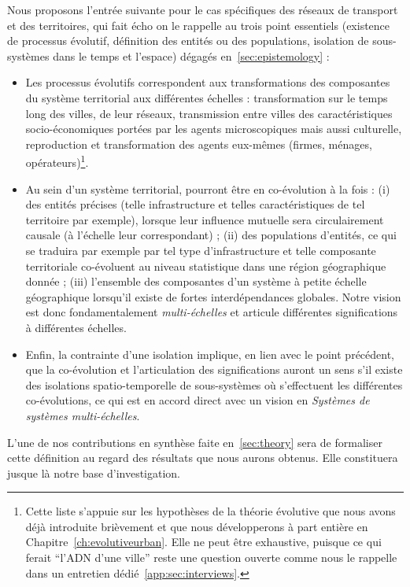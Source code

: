 Nous proposons l'entrée suivante pour le cas spécifiques des réseaux de transport et des territoires, qui fait écho on le rappelle au trois point essentiels (existence de processus évolutif, définition des entités ou des populations, isolation de sous-systèmes dans le temps et l'espace) dégagés en~\ref{sec:epistemology} :
\begin{itemize}
	\item Les processus évolutifs correspondent aux transformations des composantes du système territorial aux différentes échelles : transformation sur le temps long des villes, de leur réseaux, transmission entre villes des caractéristiques socio-économiques portées par les agents microscopiques mais aussi culturelle, reproduction et transformation des agents eux-mêmes (firmes, ménages, opérateurs)\footnote{Cette liste s'appuie sur les hypothèses de la théorie évolutive que nous avons déjà introduite brièvement et que nous développerons à part entière en Chapitre~\ref{ch:evolutiveurban}. Elle ne peut être exhaustive, puisque ce qui ferait ``l'ADN d'une ville'' reste une question ouverte comme nous le rappelle  dans un entretien dédié~\ref{app:sec:interviews}.}.
	\item Au sein d'un système territorial, pourront être en co-évolution à la fois : (i) des entités précises (telle infrastructure et telles caractéristiques de tel territoire par exemple), lorsque leur influence mutuelle sera circulairement causale (à l'échelle leur correspondant) ; (ii) des populations d'entités, ce qui se traduira par exemple par tel type d'infrastructure et telle composante territoriale co-évoluent au niveau statistique dans une région géographique donnée ; (iii) l'ensemble des composantes d'un système à petite échelle géographique lorsqu'il existe de fortes interdépendances globales. Notre vision est donc fondamentalement \emph{multi-échelles} et articule différentes significations à différentes échelles.
	\item Enfin, la contrainte d'une isolation implique, en lien avec le point précédent, que la co-évolution et l'articulation des significations auront un sens s'il existe des isolations spatio-temporelle de sous-systèmes où s'effectuent les différentes co-évolutions, ce qui est en accord direct avec un vision en \emph{Systèmes de systèmes multi-échelles}.
\end{itemize}



L'une de nos contributions en synthèse faite en~\ref{sec:theory} sera de formaliser cette définition au regard des résultats que nous aurons obtenus. Elle constituera jusque là notre base d'investigation.


